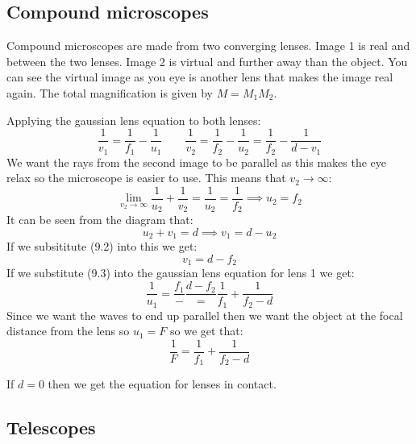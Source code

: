 \documentclass{article}
\begin{document}
\subsection*{Compound microscopes}

Compound microscopes are made from two converging lenses. Image 1 is real and between the two lenses. Image 2 is virtual and further away than the object. You can see the virtual image as you eye is another lens that makes the image real again. The total magnification is given by \(M=M_1M_2\).

\begin{center}
\end{center} 

Applying the gaussian lens equation to both lenses:
\[\frac{1}{v_1}=\frac{1}{f_1}-\frac{1}{u_1}\qquad\frac{1}{v_2}=\frac{1}{f_2}-\frac{1}{u_2}=\frac{1}{f_2}-\frac{1}{d-v_1}\]
We want the rays from the second image to be parallel as this makes the eye relax so the microscope is easier to use. This means that \(v_2\to\infty\):
\[\lim_{v_2\to\infty}\frac{1}{u_2}+\frac{1}{v_2}=\frac{1}{u_2}=\frac{1}{f_2}\implies u_2=f_2\tag{9.2}\]
It can be seen from the diagram that:
\[u_2+v_1=d\implies v_1=d-u_2\]
If we subsititute (9.2) into this we get:
\[v_1=d-f_2\tag{9.3}\]
If we substitute (9.3) into the gaussian lens equation for lens 1 we get:
\[\frac{1}{u_1}=\frac{f_1}-\frac{d-f_2}=\frac{1}{f_1}+\frac{1}{f_2-d}\]
Since we want the waves to end up parallel then we want the object at the focal distance from the lens so \(u_1=F\) so we get that:
\[\frac 1F= \frac{1}{f_1}+\frac{1}{f_2-d}\]

If \(d=0\) then we get the equation for lenses in contact.

\subsection*{Telescopes}
\end{document}
